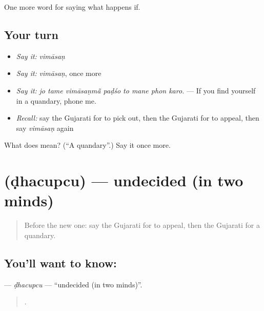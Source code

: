\begin{grammarlens}[title={What you've built}]
One more word for saying what happens if.
\end{grammarlens}

\subsection*{Your turn}
\begin{itemize}
\raggedright
  \item \emph{Say it:} \emph{vimāsaṇ}
  \item \emph{Say it:} \emph{vimāsaṇ}, once more
  \item \emph{Say it:} \emph{jo tame vimāsaṇmā̃ paḍśo to mane phon karo.} — If you find yourself in a quandary, phone me.
  \item \emph{Recall:} say the Gujarati for to pick out, then the Gujarati for to appeal, then say \emph{vimāsaṇ} again
\end{itemize}

\begin{tcolorbox}[breakable,colback=teal!4,colframe=teal!35!black,title={Before you move on}]
What does  mean? (\textquotedblleft{}A quandary\textquotedblright{}.) Say it once more.
\end{tcolorbox}
\section[\texorpdfstring{\gu{ઢચુપચુ} (ḍhacupcu)}{ઢચુપચુ (ḍhacupcu)}]{ (ḍhacupcu) — undecided (in two minds)}

\label{lesson:GU-C538-dhacupcu}



\begin{quote}
Before the new one: say the Gujarati for to appeal, then the Gujarati for a quandary.
\end{quote}

\subsection*{You'll want to know: }
\textbf{} — \emph{ḍhacupcu} — \textquotedblleft{}undecided (in two minds)\textquotedblright{}.

\begin{quote}
         .
\end{quote}


